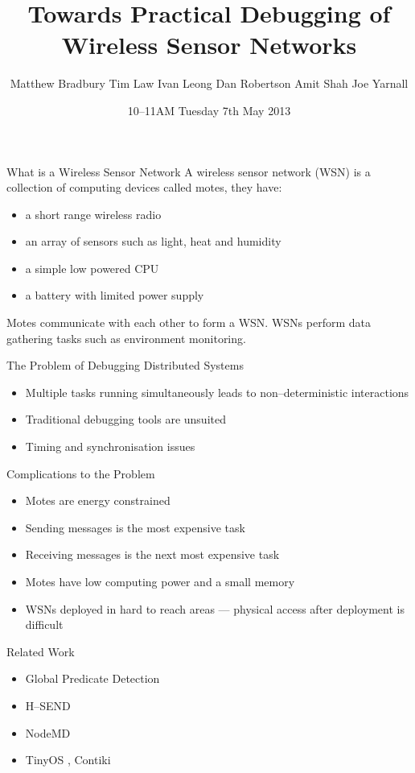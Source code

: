 \documentclass[usenames,dvipsnames]{beamer}
\title{Towards Practical Debugging of Wireless Sensor Networks}
\author[Bradbury, Law, Leong, Robertson, Shah, Yarnall]{Matthew Bradbury\newline
Tim Law\newline
Ivan Leong\newline
Dan Robertson\newline
Amit Shah\newline
Joe Yarnall}
\institute{CS407: Fourth Year Project}
\date{10--11AM Tuesday 7th May 2013}
\newcommand{\subtitleframeimage}[2]{\begin{frame}\begin{block}{\centering\Large \vspace{1em} #1 \vspace{1em} }\end{block}\begin{figure}[H]\centering\texttt{[image: \#2]}\end{figure}\end{frame}}
\begin{document}
\begin{frame}
\titlepage
\end{frame}


\begin{frame}{What is a Wireless Sensor Network}
A wireless sensor network (WSN) is a collection of computing devices called motes, they have:
	\begin{itemize}
		\item a short range wireless radio
		\item an array of sensors such as light, heat and humidity
		\item a simple low powered CPU
		\item a battery with limited power supply
	\end{itemize}
Motes communicate with each other to form a WSN.
WSNs perform data gathering tasks such as environment monitoring.
\end{frame}

\begin{frame}{The Problem of Debugging Distributed Systems}
	\begin{itemize}
		\item Multiple tasks running simultaneously leads to non--deterministic interactions
		\item Traditional debugging tools are unsuited
		\item Timing and synchronisation issues
	\end{itemize}
\end{frame}

\begin{frame}{Complications to the Problem}
	\begin{itemize}
		\item Motes are energy constrained
		\item Sending messages is the most expensive task
		\item Receiving messages is the next most expensive task \cite{Shnayder04}
		\item Motes have low computing power and a small memory
		\item WSNs deployed in hard to reach areas --- physical access after deployment is difficult \cite{herbert2007adaptive}
	\end{itemize}
\end{frame}

\begin{frame}{Related Work}
	\begin{itemize}
		\item Global Predicate Detection \cite{553309}
		\item H--SEND \cite{herbert2007adaptive}
		\item NodeMD \cite{NodeMD}
		\item TinyOS \cite{tinyos}, Contiki
	\end{itemize}
\end{frame}
\end{document}

